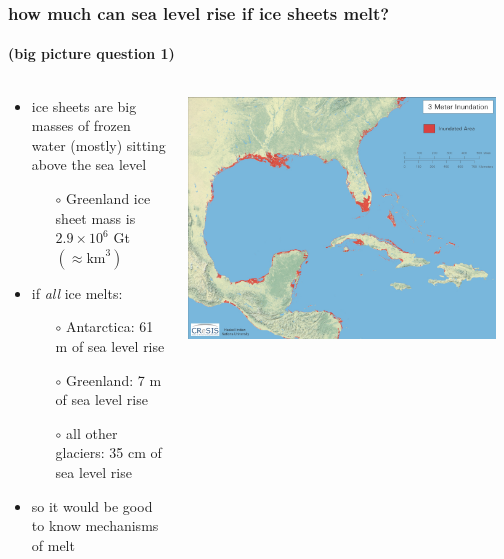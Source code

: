 \documentclass[10pt,hyperref={pdfpagelabels=true}]{beamer}
\begin{document}
\begin{frame}
  \frametitle{how much can sea level rise if ice sheets melt?}
  \framesubtitle{(big picture question 1)}

\begin{columns}
\begin{column}{0.6\textwidth}
\begin{itemize}
\item ice sheets are big masses of frozen water (mostly) sitting above the sea level
    \begin{itemize}
    \item[$\circ$] Greenland ice sheet mass is $2.9 \times 10^6$ Gt \quad $(\approx \text{km}^3)$ %
    \end{itemize}
\item if \emph{all} ice melts:
    \begin{itemize}
    \item[$\circ$] Antarctica: 61 m of sea level rise
    \item[$\circ$] Greenland: 7 m of sea level rise
    \item[$\circ$] all other glaciers: 35 cm of sea level rise
    \end{itemize}
\item so it would be good to know mechanisms of melt
\end{itemize}
\end{column}
\begin{column}{0.4\textwidth}

\includegraphics[width=0.95\textwidth]{southeastern_us_3m}
\end{column}
\end{columns}
\end{frame}
\end{document}
